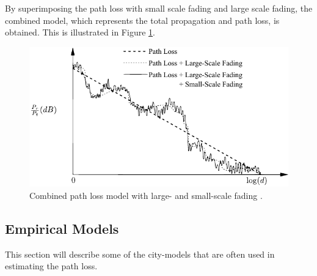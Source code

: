 By superimposing the path loss with small scale fading and large scale fading, the combined model, which represents the total propagation and path loss, is obtained. This is illustrated in Figure \ref{fig:mul_combined}. 

\begin{figure}[htbp]
    \centering
    \includegraphics{img/analysis/goldsmith_combined}
    \caption{Combined path loss model with large- and small-scale fading \cite{goldsmith2005wireless}.}
    \label{fig:mul_combined}
\end{figure}

\subsection{Empirical Models}
This section will describe some of the city-models that are often used in estimating the path loss. 

